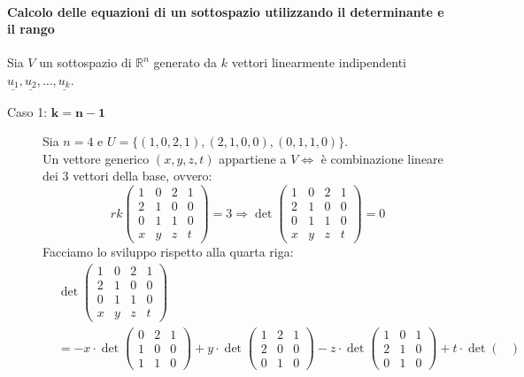 \documentclass[a4paper]{article}
\theoremstyle{definition}
\begin{document}
\paragraph{Calcolo delle equazioni di un sottospazio utilizzando il determinante e il rango}
Sia $V$ un sottospazio di $\mathbb{R}^n$ generato da $k$ vettori linearmente indipendenti $\underline{u_1}, \underline{u_2}, \ldots, \underline{u_k}$.
\begin{description}
	\item[Caso 1: $\mathbf{k = n - 1}$] Sia $n = 4$ e $U = \{(1, 0, 2, 1), (2, 1, 0, 0), (0, 1, 1, 0)\}$. \\
	Un vettore generico $(x, y, z, t)$ appartiene a $V \Leftrightarrow$ è combinazione lineare dei 3 vettori della base, ovvero:
	\[rk\begin{pmatrix}
			1 & 0 & 2 & 1 \\
			2 & 1 & 0 & 0 \\
			0 & 1 & 1 & 0 \\
			x & y & z & t
		\end{pmatrix} = 3 \Rightarrow \det \begin{pmatrix}
			1 & 0 & 2 & 1 \\
			2 & 1 & 0 & 0 \\
			0 & 1 & 1 & 0 \\
			x & y & z & t
		\end{pmatrix} = 0\]
	Facciamo lo sviluppo rispetto alla quarta riga:
	\begin{align*}
		&\det \begin{pmatrix}
			1 & 0 & 2 & 1 \\
			2 & 1 & 0 & 0 \\
			0 & 1 & 1 & 0 \\
			x & y & z & t
		\end{pmatrix} \\
		&= - x \cdot \det \begin{pmatrix}
			0 & 2 & 1 \\
			1 & 0 & 0 \\
			1 & 1 & 0
		\end{pmatrix} + y \cdot \det \begin{pmatrix}
			1 & 2 & 1 \\
			2 & 0 & 0 \\
			0 & 1 & 0
		\end{pmatrix} - z \cdot \det \begin{pmatrix}
			1 & 0 & 1 \\
			2 & 1 & 0 \\
			0 & 1 & 0
		\end{pmatrix} + t \cdot \det \begin{pmatrix}

\end{pmatrix}
\end{align*}
\end{description}
\end{document}

